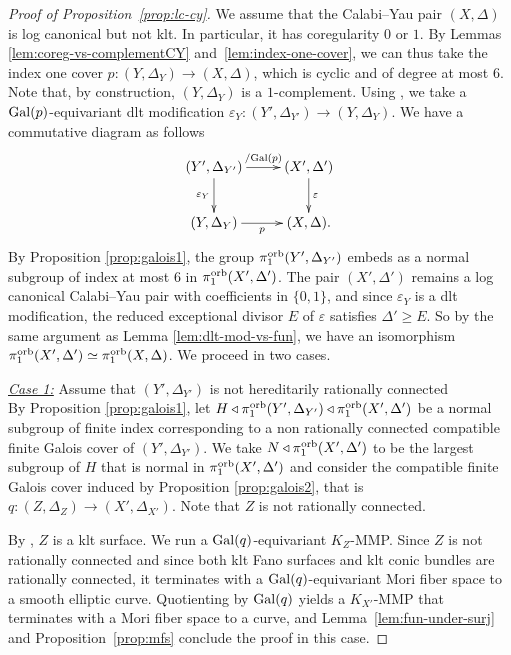 \documentclass{amsart}
\theoremstyle{definition}
\theoremstyle{remark}
\numberwithin{equation}{section}
\begin{document}
\begin{proof}[Proof of Proposition~\ref{prop:lc-cy}]
We assume that the Calabi--Yau pair $(X,\Delta)$ is log canonical but not klt. In particular, it has coregularity $0$ or $1$. By Lemmas \ref{lem:coreg-vs-complementCY} and~\ref{lem:index-one-cover}, we can thus take the index one cover $p:(Y,\Delta_Y) \rightarrow (X,\Delta)$, which is cyclic and of degree at most $6$. Note that, by construction, $(Y,\Delta_Y)$ is a $1$-complement.
Using \cite[Proposition 2.16]{MS21}, we take a ${\rm Gal}(p)$-equivariant dlt modification $\varepsilon_Y:(Y',\Delta_{Y'})\to (Y,\Delta_Y)$.
We have a commutative diagram as follows 
\[
\xymatrix{
(Y',\Delta_{Y'}) \ar[r]^-{/{\rm Gal}(p)} \ar[d]_-{\varepsilon_Y} 
& (X',\Delta')  \ar[d]^-{\varepsilon} \\ 
(Y,\Delta_{Y}) \ar[r]_-{p}
& (X,\Delta) .
}
\]
By Proposition \ref{prop:galois1}, the group $\pi_1^{\rm orb}(Y',\Delta_{Y'})$ embeds as a normal subgroup of index at most $6$ in $\pi_1^{\rm orb}(X',\Delta')$.
The pair $(X',\Delta')$ remains a log canonical Calabi--Yau pair with coefficients in $\{0,1\}$, and since $\varepsilon_Y$ is a dlt modification, the reduced exceptional divisor $E$ of $\varepsilon$ satisfies $\Delta'\ge E$. So by the same argument as Lemma \ref{lem:dlt-mod-vs-fun}, we have an isomorphism 
$\pi_1^{\rm orb}(X',\Delta') \simeq \pi_1^{\rm orb}(X,\Delta)$.
We proceed in two cases.

\medskip 

\noindent\underline{\textit{Case 1:}} Assume that $(Y',\Delta_{Y'})$ is not hereditarily rationally connected\\

By Proposition \ref{prop:galois1}, let $H\triangleleft\pi_1^{\rm orb}(Y',\Delta_{Y'})\triangleleft \pi_1^{\rm orb}(X',\Delta')$
be a normal subgroup of finite index corresponding to a non rationally connected compatible finite Galois cover of $(Y',\Delta_{Y'})$. We take $N\triangleleft \pi_1^{\rm orb}(X',\Delta')$ to be the largest subgroup of $H$ that is normal in $\pi_1^{\rm orb}(X',\Delta')$ and consider the compatible finite Galois cover induced by Proposition \ref{prop:galois2}, that is $q:(Z,\Delta_Z)\to (X',\Delta_{X'})$. Note that $Z$ is not rationally connected. 

By \cite[Proposition 5.20(4)]{KM98}, $Z$ is a klt surface.
We run a ${\rm Gal}(q)$-equivariant $K_{Z}$-MMP. Since $Z$ is not rationally connected and since both klt Fano surfaces and klt conic bundles are rationally connected, it terminates with a ${\rm Gal}(q)$-equivariant Mori fiber space to a smooth elliptic curve. Quotienting by ${\rm Gal}(q)$ yields a $K_{X'}$-MMP that terminates with a Mori fiber space to a curve, and Lemma~\ref{lem:fun-under-surj} and Proposition~\ref{prop:mfs} conclude the proof in this case.


\end{proof}
\end{document}
